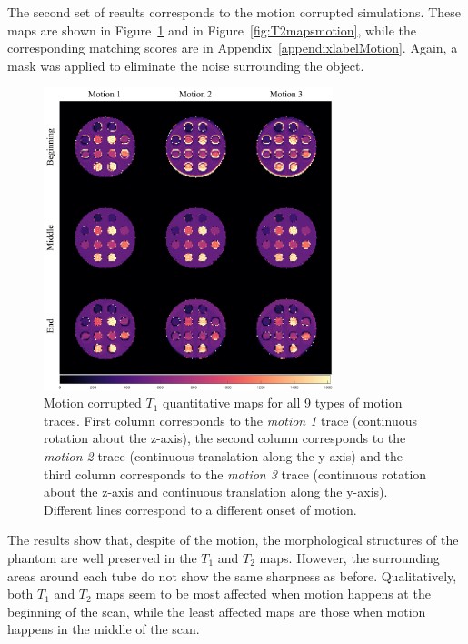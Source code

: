 The second set of results corresponds to the motion corrupted simulations.
These maps are shown in Figure~\ref{fig:T1mapsmotion} and in Figure~\ref{fig:T2mapsmotion}, while the corresponding matching scores are in Appendix~\ref{appendixlabelMotion}.
Again, a mask was applied to eliminate the noise surrounding the object.

\begin{figure}[ht]
    \centering
    \includegraphics[width=0.75\textwidth]{images/mrf/T1mapsmotion}
    \caption{Motion corrupted $T_1$ quantitative maps for all 9 types of motion traces. First column corresponds to the \textit{motion 1} trace (continuous rotation about the z-axis), the second column corresponds to the \textit{motion 2} trace (continuous translation along the y-axis) and the third column corresponds to the \textit{motion 3} trace (continuous rotation about the z-axis and continuous translation along the y-axis). Different lines correspond to a different onset of motion. }
    \label{fig:T1mapsmotion}
\end{figure}

\hfill

The results show that, despite of the motion, the morphological structures of the phantom are well preserved in the $T_1$ and $T_2$ maps. 
However, the surrounding areas around each tube do not show the same sharpness as before.
Qualitatively, both $T_1$ and $T_2$ maps seem to be most affected when motion happens at the beginning of the scan, while the least affected maps are those when motion happens in the middle of the scan.

